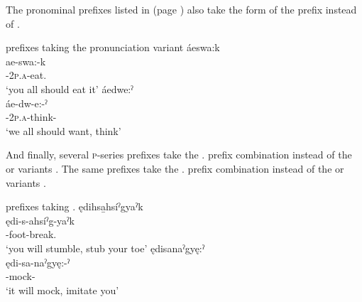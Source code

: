\FloatBarrier
The pronominal prefixes listed in  (page \pageref{figtab:1:efact}) also take the  form of the {\indefinite} prefix instead of  .


\ea\label{ex:pronominalprefixpronunex10} prefixes taking the  \textsc{\indefinite} pronunciation variant
\ea áeswa:k\\
\gll ae-swa:-k\\
 {\indefinite}-\textsc{2p.a}-eat.{\zeropunctual}\\
\glt `you all should eat it'
\ex áedwe:ˀ\\
\gll áe-dw-e:-ˀ\\
 {\indefinite}-\textsc{2p.a}-think-{\punctual}\\
\glt `we all should want, think'
\z
\z

And finally, several \textsc{p}-series prefixes take the  \textsc{\future.\cislocative} prefix combination instead of the  or  variants . The same prefixes take the  \textsc{\factual.\dualic} prefix combination instead of the  or  variants .

\ea\label{ex:pronominalprefixpronunex11} prefixes taking  \textsc{\future.\cislocative}
\ea ędihsa̱hsíˀgyaˀk\\
\gll ędi-s-ahsíˀg-yaˀk\\
 {\futurecislocative}-foot-break.{\zeropunctual}\\
\glt `you will stumble, stub your toe'
\ex ędisanaˀgyę:ˀ \\
\gll ędi-sa-naˀgyę:-ˀ \\
{\futurecislocative}-mock-{\punctual}\\
\glt ‘it will mock, imitate you’  

\z
\z

